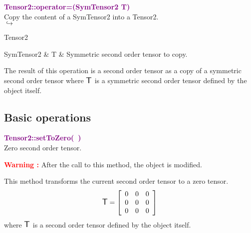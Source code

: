 \textcolor{purple}{\textbf{Tensor2::operator=(SymTensor2 T)}}\label{Tensor2::operator=(SymTensor2 T)}\\
Copy the content of a SymTensor2 into a Tensor2.\\ \hspace*{5mm}$\hookrightarrow$
\vspace*{-2em}\begin{tcolorbox}[grow to left by=-1cm, width=\textwidth-1cm,myArgs,tabularx={l|R}]
Tensor2
\end{tcolorbox}

\begin{tcolorbox}[width=\textwidth,myArgs,tabularx={ll|R}]
SymTensor2 & T & Symmetric second order tensor to copy.
\end{tcolorbox}

The result of this operation is a second order tensor as a copy of a symmetric second order tensor where $\mbox{\large\ensuremath{\mathsf{T}}}$ is a symmetric second order tensor defined by the object itself.

\subsection{Basic operations}

\textcolor{purple}{\textbf{Tensor2::setToZero(~)}}\label{Tensor2::setToZero()}\\
Zero second order tensor.

\hspace*{10mm}\textcolor{red}{\textbf{Warning :}} After the call to this method, the object is modified.

This method transforms the current second order tensor to a zero tensor.
\begin{equation*}
\mbox{\large\ensuremath{\mathsf{T}}}=\left[\begin{array}{ccc}
0 & 0 & 0\\
0 & 0 & 0\\
0 & 0 & 0
\end{array}\right]
\end{equation*}
where $\mbox{\large\ensuremath{\mathsf{T}}}$ is a second order tensor defined by the object itself.

